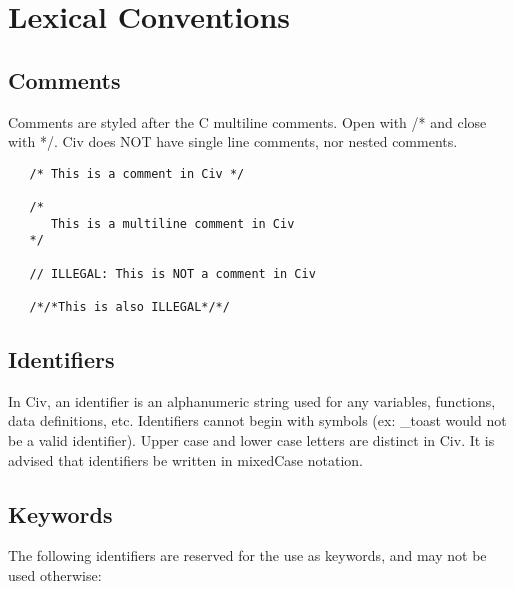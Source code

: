\documentclass[a4paper]{article}
\begin{document}
\section{Lexical Conventions}

\subsection{Comments}

Comments are styled after the C multiline comments. Open with /* and close with */. Civ does NOT have single line comments, nor nested comments.

{\selectfont

\begin{lstlisting}
   /* This is a comment in Civ */
  
   /*
      This is a multiline comment in Civ
   */
    
   // ILLEGAL: This is NOT a comment in Civ
   
   /*/*This is also ILLEGAL*/*/
\end{lstlisting}
}

\subsection{Identifiers}

In Civ, an identifier is an alphanumeric string used for any variables, functions, data definitions, etc. Identifiers cannot begin with symbols (ex: \_toast would not be a valid identifier). Upper case and lower case letters are distinct in Civ. It is advised that identifiers be written in mixedCase notation.

\subsection{Keywords}

The following identifiers are reserved for the use as keywords, and may not be used otherwise:


\begin{multicols}{2}
\noindent 
{}
\end{multicols}
\end{document}
